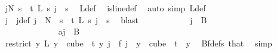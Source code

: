 \begin{isabellebody}
\ {\isachardoublequoteopen}{\isacharparenleft}{\kern0pt}{\isasymexists}j{\isacharless}{\kern0pt}N{\isacharprime}{\kern0pt}{\isachardot}{\kern0pt}\ {\isacharparenleft}{\kern0pt}{\isasymforall}s\ {\isacharless}{\kern0pt}\ t{\isachardot}{\kern0pt}\ L{\isacharprime}{\kern0pt}\ s\ j\ {\isacharequal}{\kern0pt}\ s{\isacharparenright}{\kern0pt}{\isacharparenright}{\kern0pt}{\isachardoublequoteclose}\ \isamarkupfalse%
\ L{\isacharunderscore}{\kern0pt}def\ \isamarkupfalse%
\ is{\isacharunderscore}{\kern0pt}line{\isacharunderscore}{\kern0pt}def\ \isamarkupfalse%
\ {\isacharparenleft}{\kern0pt}auto\ simp{\isacharcolon}{\kern0pt}\ L{\isacharprime}{\kern0pt}{\isacharunderscore}{\kern0pt}def{\isacharparenright}{\kern0pt}\isanewline
\ \ \ \ \ \ \ \ \ \ \isamarkupfalse%
\ \isamarkupfalse%
\ j\ \ j{\isacharunderscore}{\kern0pt}def{\isacharcolon}{\kern0pt}\ {\isachardoublequoteopen}j\ {\isacharless}{\kern0pt}\ N{\isacharprime}{\kern0pt}\ {\isasymand}\ {\isacharparenleft}{\kern0pt}{\isasymforall}s\ {\isacharless}{\kern0pt}\ t{\isachardot}{\kern0pt}\ L{\isacharprime}{\kern0pt}\ s\ j\ {\isacharequal}{\kern0pt}\ s{\isacharparenright}{\kern0pt}{\isachardoublequoteclose}\ \isamarkupfalse%
\ blast\isanewline
\ \ \ \ \ \ \ \ \ \ \isamarkupfalse%
\ {\isachardoublequoteopen}j\ {\isasymnotin}\ B\ {}{\isachardoublequoteclose}\isanewline
\ \ \ \ \ \ \ \ \ \ \isamarkupfalse%
\ \isanewline
\ \ \ \ \ \ \ \ \ \ \ \ \isamarkupfalse%
\ a{\isacharcolon}{\kern0pt}{\isachardoublequoteopen}j\ {\isasymin}\ B\ {}{\isachardoublequoteclose}\isanewline
\ \ \ \ \ \ \ \ \ \ \ \ \isamarkupfalse%
\ \isamarkupfalse%
\ {\isachardoublequoteopen}{\isacharparenleft}{\kern0pt}restrict\ {\isacharparenleft}{\kern0pt}{\isasymlambda}y{\isachardot}{\kern0pt}\ L\ {\isacharparenleft}{\kern0pt}y\ {}{\isacharparenright}{\kern0pt}{\isacharparenright}{\kern0pt}\ {\isacharparenleft}{\kern0pt}cube\ {}\ t{\isacharparenright}{\kern0pt}{\isacharparenright}{\kern0pt}\ y\ j\ {\isacharequal}{\kern0pt}\ f\ j{\isachardoublequoteclose}\ \ {\isachardoublequoteopen}y\ {\isasymin}\ cube\ {}\ t{\isachardoublequoteclose}\ \ y\ \isamarkupfalse%
\ Bf{\isacharunderscore}{\kern0pt}defs\ that\ \isamarkupfalse%
\ simp\isanewline
\ \ \ \ \ \ \ \ \ \ \ \ \isamarkupfalse%
\ \isamarkupfalse%

\end{isabellebody}
